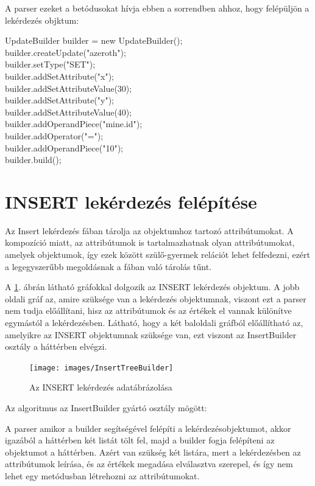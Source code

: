 A parser ezeket a betódusokat hívja ebben a sorrendben ahhoz, hogy felépüljön a lekérdezés objktum:

UpdateBuilder builder = new UpdateBuilder(); \\
builder.createUpdate("azeroth"); \\
builder.setType("SET"); \\
builder.addSetAttribute("x"); \\
builder.addSetAttributeValue(30); \\
builder.addSetAttribute("y"); \\
builder.addSetAttributeValue(40); \\
builder.addOperandPiece("mine.id"); \\
builder.addOperator("="); \\
builder.addOperandPiece("10"); \\
builder.build(); \\


\section{INSERT lekérdezés felépítése}

Az Insert lekérdezés fában tárolja az objektumhoz tartozó attribútumokat. A kompozíció miatt, az attribútumok is tartalmazhatnak olyan attribútumokat, amelyek objektumok, így ezek között szülő-gyermek relációt lehet felfedezni, ezért a legegyszerűbb megoldásnak a fában való tárolás tűnt.

A  \ref{fig:insertTreeBuilder}. ábrán látható gráfokkal dolgozik az INSERT lekérdezés objektum. A jobb oldali gráf az, amire szüksége van a lekérdezés objektumnak, viszont ezt a parser nem tudja előállítani, hisz az attribútumok és az értékek el vannak különítve egymástól a lekérdezésben. Látható, hogy a két baloldali gráfból előállítható az, amelyikre az INSERT objektumnak szüksége van, ezt viszont az InsertBuilder osztály a háttérben elvégzi.



\begin{figure}[htb]
	\begin{center}
		\texttt{[image: images/InsertTreeBuilder]}
		\caption{Az INSERT lekérdezés adatábrázolása }
		\label{fig:insertTreeBuilder}
	\end{center}
\end{figure}


Az algoritmus az InsertBuilder gyártó osztály mögött:

A parser amikor a builder segítségével felépíti a lekérdezésobjektumot, akkor igazából a háttérben két listát tölt fel, majd a builder fogja felépíteni az objektumot a háttérben. Azért van szükség két listára, mert a lekérdezésben az attribútumok leírása, és az értékek megadása elválasztva szerepel, és így nem lehet egy metódusban létrehozni az attribútumokat. 

